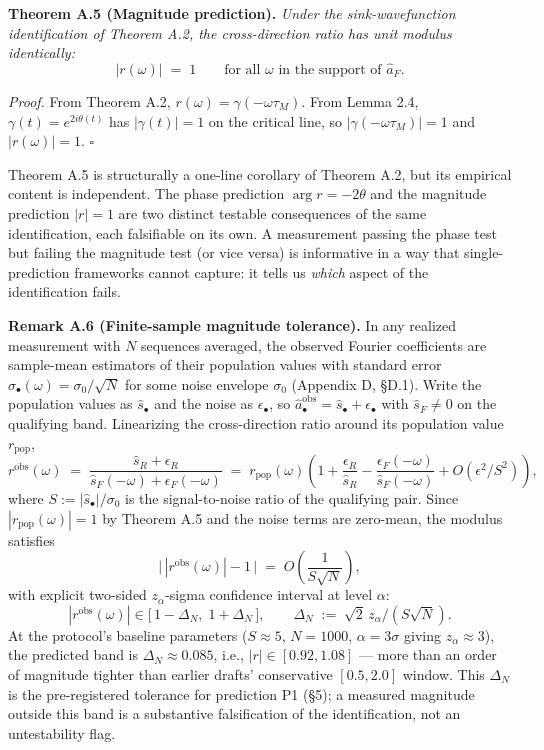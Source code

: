 \documentclass[
  letterpaper,
  11pt]{article}
\theoremstyle{plain}
\theoremstyle{definition}
\theoremstyle{remark}
\begin{document}
\textbf{Theorem A.5 (Magnitude prediction).} \emph{Under the sink-wavefunction identification of Theorem A.2, the cross-direction ratio has unit modulus identically:}
\[|r(\omega)| \;=\; 1 \qquad \text{for all $\omega$ in the support of $\hat a_F$.}\]

\emph{Proof.} From Theorem A.2, \(r(\omega) = \gamma(-\omega\tau_M)\). From Lemma 2.4, \(\gamma(t) = e^{2i\theta(t)}\) has \(|\gamma(t)| = 1\) on the critical line, so \(|\gamma(-\omega\tau_M)| = 1\) and \(|r(\omega)| = 1\). \(\square\)

Theorem A.5 is structurally a one-line corollary of Theorem A.2, but its empirical content is independent. The phase prediction \(\arg r = -2\theta\) and the magnitude prediction \(|r| = 1\) are two distinct testable consequences of the same identification, each falsifiable on its own. A measurement passing the phase test but failing the magnitude test (or vice versa) is informative in a way that single-prediction frameworks cannot capture: it tells us \emph{which} aspect of the identification fails.

\textbf{Remark A.6 (Finite-sample magnitude tolerance).} In any realized measurement with \(N\) sequences averaged, the observed Fourier coefficients are sample-mean estimators of their population values with standard error \(\sigma_\bullet(\omega) = \sigma_0/\sqrt{N}\) for some noise envelope \(\sigma_0\) (Appendix D, §D.1). Write the population values as \(\hat s_\bullet\) and the noise as \(\epsilon_\bullet\), so \(\hat a_\bullet^\text{obs} = \hat s_\bullet + \epsilon_\bullet\) with \(\hat s_F \neq 0\) on the qualifying band. Linearizing the cross-direction ratio around its population value \(r_\text{pop}\),
\[r^\text{obs}(\omega) \;=\; \frac{\hat s_R + \epsilon_R}{\hat s_F(-\omega) + \epsilon_F(-\omega)} \;=\; r_\text{pop}(\omega)\left(1 + \frac{\epsilon_R}{\hat s_R} - \frac{\epsilon_F(-\omega)}{\hat s_F(-\omega)} + O(\epsilon^2/S^2)\right),\]
where \(S := |\hat s_\bullet|/\sigma_0\) is the signal-to-noise ratio of the qualifying pair. Since \(|r_\text{pop}(\omega)| = 1\) by Theorem A.5 and the noise terms are zero-mean, the modulus satisfies
\[\bigl|\,|r^\text{obs}(\omega)| - 1\,\bigr| \;=\; O\!\left(\frac{1}{S\sqrt{N}}\right),\]
with explicit two-sided \(z_\alpha\)-sigma confidence interval at level \(\alpha\):
\[|r^\text{obs}(\omega)| \in \bigl[\,1 - \Delta_N,\; 1 + \Delta_N\,\bigr], \qquad \Delta_N \;:=\; \sqrt{2}\,z_\alpha/(S\sqrt{N}).\]
At the protocol's baseline parameters (\(S \approx 5\), \(N = 1000\), \(\alpha = 3\sigma\) giving \(z_\alpha \approx 3\)), the predicted band is \(\Delta_N \approx 0.085\), i.e., \(|r| \in [0.92, 1.08]\) --- more than an order of magnitude tighter than earlier drafts' conservative \([0.5, 2.0]\) window. This \(\Delta_N\) is the pre-registered tolerance for prediction P1 (§5); a measured magnitude outside this band is a substantive falsification of the identification, not an untestability flag.
\end{document}
